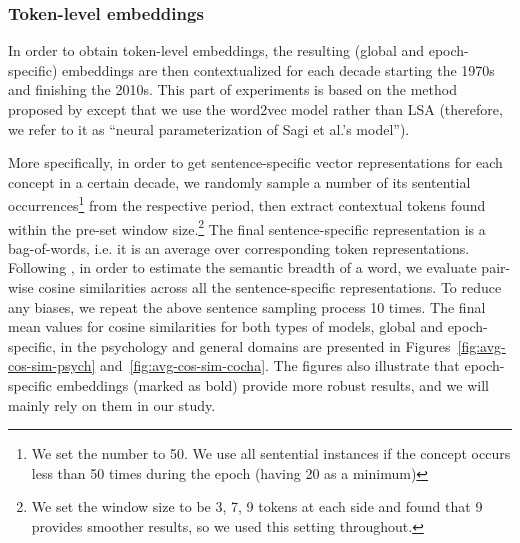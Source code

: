 \documentclass[output=paper]{langsci/langscibook}
\begin{document}
\subsubsection{Token-level embeddings}
In order to obtain token-level embeddings, the resulting (global and epoch-spe\-cif\-ic) embeddings are then contextualized for each decade starting the 1970s and finishing the 2010s. This part of experiments is based on the method proposed by \citet{sagi-etal-2009-semantic} except that we use the word2vec model \citep{mikolov2013-distributed} rather than LSA \citep{landauer2013handbook} (therefore, we refer to it as ``neural parameterization of Sagi et al.'s model''). 

More specifically, in order to get sentence-specific vector representations for each concept in  a certain decade, we randomly sample a number of its sentential occurrences\footnote{We set the number to 50. We use all sentential instances if the concept occurs less than 50 times during the epoch (having 20 as a minimum)} from the respective period, then extract contextual tokens found within the pre-set window size.\footnote{We set the window size to be 3, 7, 9 tokens at each side and found that 9 provides smoother results, so we used this setting throughout.}
The final sentence-specific representation is a bag-of-words, i.e. it is an average over corresponding token representations.
Following \citet{sagi-etal-2009-semantic}, in order to estimate the semantic breadth of a word, we evaluate pair-wise cosine similarities across all the sentence-specific representations.   
To reduce any biases, we repeat the above sentence sampling process 10 times. The final mean values for cosine similarities for both types of models, global and epoch-specific, in the psychology and general domains are presented in Figures~\ref{fig:avg-cos-sim-psych} and~\ref{fig:avg-cos-sim-cocha}. The figures also illustrate that epoch-specific embeddings (marked as bold) provide more robust results, and we will mainly rely on them in our study.
\end{document}
